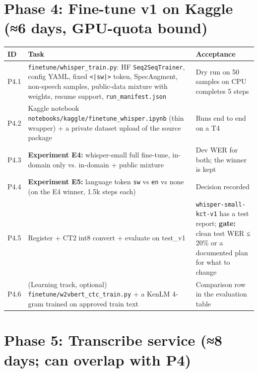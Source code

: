 \documentclass[11pt]{article}
\begin{document}
\hypertarget{phase-4-fine-tune-v1-on-kaggle-6-days-gpu-quota-bound}{%
\section{Phase 4: Fine-tune v1 on Kaggle (≈6 days, GPU-quota bound)}\label{phase-4-fine-tune-v1-on-kaggle-6-days-gpu-quota-bound}}

\begin{longtable}[]{@{}>{\raggedright\arraybackslash}p{}>{\raggedright\arraybackslash}p{}>{\raggedright\arraybackslash}p{}@{}}
\toprule\noalign{}
ID & Task & Acceptance \\
\midrule\noalign{}
\endhead
\bottomrule\noalign{}
\endlastfoot
P4.1 & \texttt{finetune/\allowbreak{}whisper\_\allowbreak{}train.\allowbreak{}py}: HF \texttt{Seq2SeqTrainer}, config YAML, fixed \texttt{<|\allowbreak{}sw|\allowbreak{}>} token, SpecAugment, non-speech samples, public-data mixture with weights, resume support, \texttt{run\_\allowbreak{}manifest.\allowbreak{}json} & Dry run on 50 samples on CPU completes 5 steps \\
P4.2 & Kaggle notebook \texttt{notebooks/\allowbreak{}kaggle/\allowbreak{}finetune\_\allowbreak{}whisper.\allowbreak{}ipynb} (thin wrapper) + a private dataset upload of the source package & Runs end to end on a T4 \\
P4.3 & \textbf{Experiment E4:} whisper-small full fine-tune, in-domain only vs. in-domain + public mixture & Dev WER for both; the winner is kept \\
P4.4 & \textbf{Experiment E5:} language token \texttt{sw} vs \texttt{en} vs none (on the E4 winner, 1.5k steps each) & Decision recorded \\
P4.5 & Register + CT2 int8 convert + evaluate on test\_v1 & \texttt{whisper-\allowbreak{}small-\allowbreak{}kct-\allowbreak{}v1} has a test report; \textbf{gate:} clean test WER ≤ 20\% or a documented plan for what to change \\
P4.6 & (Learning track, optional) \texttt{finetune/\allowbreak{}w2vbert\_\allowbreak{}ctc\_\allowbreak{}train.\allowbreak{}py} + a KenLM 4-gram trained on approved train text & Comparison row in the evaluation table \\
\end{longtable}

\hypertarget{phase-5-transcribe-service-8-days-can-overlap-with-p4}{%
\section{Phase 5: Transcribe service (≈8 days; can overlap with P4)}\label{phase-5-transcribe-service-8-days-can-overlap-with-p4}}
\end{document}
